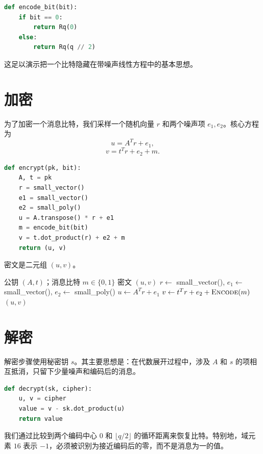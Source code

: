 \begin{lstlisting}[language=Python]
def encode_bit(bit):
    if bit == 0:
        return Rq(0)
    else:
        return Rq(q // 2)
\end{lstlisting}

这足以演示把一个比特隐藏在带噪声线性方程中的基本思想。

\section{加密}

为了加密一个消息比特，我们采样一个随机向量 $r$ 和两个噪声项 $e_1,e_2$。核心方程为
\[
u = A^T r + e_1,
\]
\[
v = t^T r + e_2 + m.
\]

\begin{lstlisting}[language=Python]
def encrypt(pk, bit):
    A, t = pk
    r = small_vector()
    e1 = small_vector()
    e2 = small_poly()
    u = A.transpose() * r + e1
    m = encode_bit(bit)
    v = t.dot_product(r) + e2 + m
    return (u, v)
\end{lstlisting}

密文是二元组 $(u,v)$。

\begin{algorithm}[H]
\caption{玩具版加密}
\label{alg:toy-encrypt}
\begin{algorithmic}[1]
\Require 公钥 $(A,t)$；消息比特 $m\in\{0,1\}$
\Ensure 密文 $(u,v)$
\State $r \gets$ small\_vector(), \quad $e_1 \gets$ small\_vector(), \quad $e_2 \gets$ small\_poly()
\State $u \gets A^{T} r + e_1$
\State $v \gets t^{T} r + e_2 + \textsc{Encode}(m)$ 
\State \Return $(u,v)$
\end{algorithmic}
\end{algorithm}

\section{解密}

解密步骤使用秘密钥 $s$。其主要思想是：在代数展开过程中，涉及 $A$ 和 $s$ 的项相互抵消，只留下少量噪声和编码后的消息。

\begin{lstlisting}[language=Python]
def decrypt(sk, cipher):
    u, v = cipher
    value = v - sk.dot_product(u)
    return value
\end{lstlisting}

我们通过比较到两个编码中心 $0$ 和 $\lfloor q/2\rfloor$ 的循环距离来恢复比特。特别地，域元素 $16$ 表示 $-1$，必须被识别为接近编码后的零，而不是消息为一的值。

